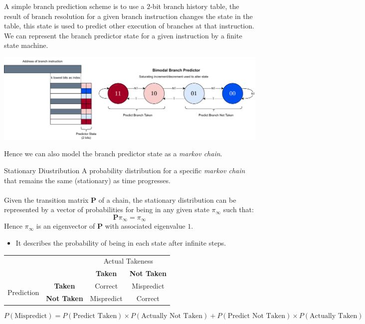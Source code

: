A simple branch prediction scheme is to use a $2$-bit branch history table, the result of branch resolution for a given branch instruction changes the state in the table, this state is used to predict other execution of branches at that instruction.
We can represent the branch predictor state for a given instruction by a finite state machine.
\begin{center}
    \includegraphics[width=.9\textwidth]{modelling/images/bimodal.drawio.png}
\end{center}
Hence we can also model the branch predictor state as a \textit{markov chain}.
\begin{definitionbox}{Stationary Diustribution}
    A probability distribution for a specific \textit{markov chain} that remains the same (stationary) as time progresses.
    \\
    \\ Given the transition matrix $\mathbf{P}$ of a chain, the stationary distribution can be represented by a vector of probabilities for being in any given state $\pi_\infty$ such that:
    \[\mathbf{P} \pi_\infty = \pi_\infty\]
    Hence $\pi_\infty$ is an eigenvector of $\mathbf{P}$ with associated eigenvalue $1$.
    \begin{itemize}
        \item It describes the probability of being in each state after infinite steps. 
    \end{itemize}
\end{definitionbox}
\begin{center}
    \begin{tabular}{r c | c c}
        & & \multicolumn{2}{c}{Actual Takeness} \\
        & & \textbf{Taken} & \textbf{Not Taken} \\
        \hline
        \multirow{2}{*}{Prediction} & \textbf{Taken} & Correct & Mispredict\\
        & \textbf{Not Taken} & Mispredict & Correct \\
    \end{tabular}
\end{center}
\[P(\text{Mispredict}) = P(\text{Predict Taken}) \times P(\text{Actually Not Taken}) + P(\text{Predict Not Taken}) \times P(\text{Actually Taken}) \]


